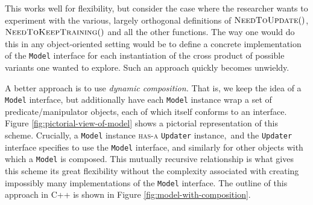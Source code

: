 \documentclass[a4paper]{article}
\newcommand{\noun}[1]{\textsc{#1}}
\begin{document}
This works well for flexibility, but consider the case where the researcher
wants to experiment with the various, largely orthogonal definitions
of $\Call{NeedToUpdate}{}()$, $\Call{NeedToKeepTraining}{}()$ and
all the other functions. The way one would do this in any object-oriented
setting would be to define a concrete implementation of the \texttt{Model}
interface for each instantiation of the cross product of possible
variants one wanted to explore. Such an approach quickly becomes unwieldy.

A better approach is to use \emph{dynamic composition. }That is, we
keep\emph{ }the idea of a \texttt{Model} interface, but additionally
have each \texttt{Model} instance wrap a set of predicate/manipulator
objects, each of which itself conforms to an interface. Figure \ref{fig:pictorial-view-of-model}
shows a pictorial representation of this scheme. Crucially, a \texttt{Model}
instance \noun{has-a} \texttt{Updater} instance,\texttt{ }and the
\texttt{Updater} interface specifies to use the \texttt{Model} interface,
and similarly for other objects with which a \texttt{Model} is composed.
This mutually recursive relationship is what gives this scheme its
great flexibility without the complexity associated with creating
impossibly many implementations of the \texttt{Model} interface. The
outline of this approach in C++ is shown in Figure \ref{fig:model-with-composition}.
\end{document}
